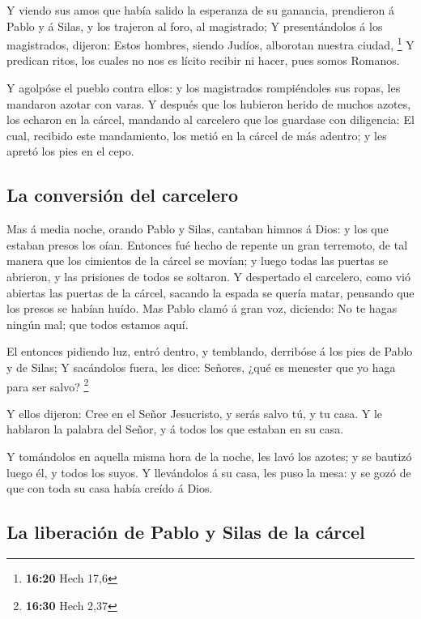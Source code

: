  Y viendo sus amos que había salido la esperanza de su
ganancia, prendieron á Pablo y á Silas, y los trajeron al foro, al
magistrado;  Y presentándolos á los magistrados, dijeron:
Estos hombres, siendo Judíos, alborotan nuestra ciudad, \footnote{\textbf{16:20}
  Hech 17,6}  Y predican ritos, los cuales no nos es lícito
recibir ni hacer, pues somos Romanos.

 Y agolpóse el pueblo contra ellos: y los magistrados
rompiéndoles sus ropas, les mandaron azotar con varas.  Y
después que los hubieron herido de muchos azotes, los echaron en la
cárcel, mandando al carcelero que los guardase con diligencia:
 El cual, recibido este mandamiento, los metió en la cárcel
de más adentro; y les apretó los pies en el cepo.

\hypertarget{la-conversiuxf3n-del-carcelero}{%
\subsection{La conversión del
carcelero}\label{la-conversiuxf3n-del-carcelero}}

 Mas á media noche, orando Pablo y Silas, cantaban himnos á
Dios: y los que estaban presos los oían.  Entonces fué
hecho de repente un gran terremoto, de tal manera que los cimientos de
la cárcel se movían; y luego todas las puertas se abrieron, y las
prisiones de todos se soltaron.  Y despertado el carcelero,
como vió abiertas las puertas de la cárcel, sacando la espada se quería
matar, pensando que los presos se habían huído.  Mas Pablo
clamó á gran voz, diciendo: No te hagas ningún mal; que todos estamos
aquí.

 El entonces pidiendo luz, entró dentro, y temblando,
derribóse á los pies de Pablo y de Silas;  Y sacándolos
fuera, les dice: Señores, ¿qué es menester que yo haga para ser salvo?
\footnote{\textbf{16:30} Hech 2,37}

 Y ellos dijeron: Cree en el Señor Jesucristo, y serás
salvo tú, y tu casa.  Y le hablaron la palabra del Señor, y
á todos los que estaban en su casa.

 Y tomándolos en aquella misma hora de la noche, les lavó
los azotes; y se bautizó luego él, y todos los suyos.  Y
llevándolos á su casa, les puso la mesa: y se gozó de que con toda su
casa había creído á Dios.

\hypertarget{la-liberaciuxf3n-de-pablo-y-silas-de-la-cuxe1rcel}{%
\subsection{La liberación de Pablo y Silas de la
cárcel}\label{la-liberaciuxf3n-de-pablo-y-silas-de-la-cuxe1rcel}}

